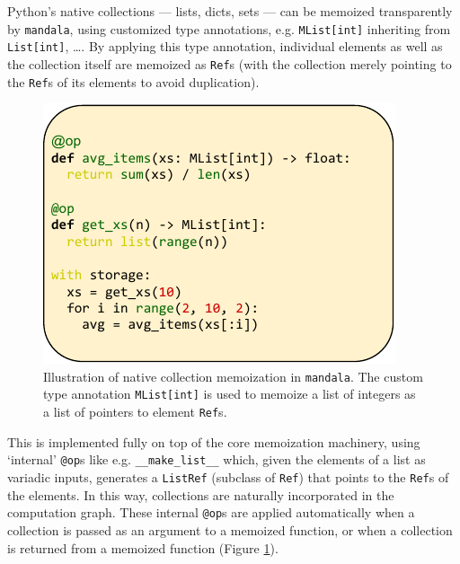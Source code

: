 \documentclass{article} %
\begin{document}
Python's native collections --- lists, dicts, sets --- can be memoized
transparently by \texttt{mandala}, using customized type annotations, e.g.
\texttt{MList[int]} inheriting from \texttt{List[int]}, \ldots. By applying this
type annotation, individual elements as well as the collection itself are
memoized as \texttt{Ref}s (with the collection merely pointing to the
\texttt{Ref}s of its elements to avoid duplication). 

\begin{figure}
    \centering
    \includegraphics[width=\linewidth]{img/list.pdf}
    \caption{Illustration of native collection memoization in \texttt{mandala}.
    The custom type annotation \texttt{MList[int]} is used to memoize a list of
    integers as a list of pointers to element \texttt{Ref}s.}
    \label{fig:list}
\end{figure}

This is implemented fully on top of the core memoization machinery, using
`internal' \texttt{@op}s like e.g. \verb|__make_list__| which, given the
elements of a list as variadic inputs, generates a \texttt{ListRef} (subclass of
\texttt{Ref}) that points to the \texttt{Ref}s of the elements. In this way,
collections are naturally incorporated in the computation graph. These internal
\texttt{@op}s are applied automatically when a collection is passed as an
argument to a memoized function, or when a collection is returned from a
memoized function (Figure \ref{fig:list}).

\end{document}
